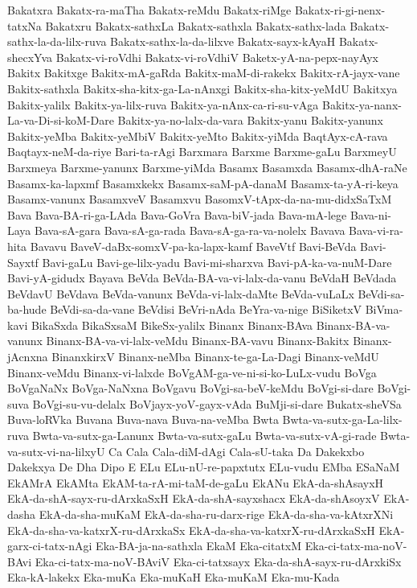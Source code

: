 {Bakatxra
Bakatx-ra-maTha
Bakatx-reMdu
Bakatx-riMge
Bakatx-ri-gi-nenx-tatxNa
Bakatxru
Bakatx-sathxLa
Bakatx-sathxla
Bakatx-sathx-lada
Bakatx-sathx-la-da-lilx-ruva
Bakatx-sathx-la-da-lilxve
Bakatx-sayx-kAyaH
Bakatx-shecxYva
Bakatx-vi-roVdhi
Bakatx-vi-roVdhiV
Baketx-yA-na-pepx-nayAyx
Bakitx
Bakitxge
Bakitx-mA-gaRda
Bakitx-maM-di-rakekx
Bakitx-rA-jayx-vane
Bakitx-sathxla
Bakitx-sha-kitx-ga-La-nAnxgi
Bakitx-sha-kitx-yeMdU
Bakitxya
Bakitx-yalilx
Bakitx-ya-lilx-ruva
Bakitx-ya-nAnx-ca-ri-su-vAga
Bakitx-ya-nanx-La-va-Di-si-koM-Dare
Bakitx-ya-no-lalx-da-vara
Bakitx-yanu
Bakitx-yanunx
Bakitx-yeMba
Bakitx-yeMbiV
Bakitx-yeMto
Bakitx-yiMda
BaqtAyx-cA-rava
Baqtayx-neM-da-riye
Bari-ta-rAgi
Barxmara
Barxme
Barxme-gaLu
BarxmeyU
Barxmeya
Barxme-yanunx
Barxme-yiMda
Basamx
Basamxda
Basamx-dhA-raNe
Basamx-ka-lapxmf
Basamxkekx
Basamx-saM-pA-danaM
Basamx-ta-yA-ri-keya
Basamx-vanunx
BasamxveV
Basamxvu
BasomxV-tApx-da-na-mu-didxSaTxM
Bava
Bava-BA-ri-ga-LAda
Bava-GoVra
Bava-biV-jada
Bava-mA-lege
Bava-ni-Laya
Bava-sA-gara
Bava-sA-ga-rada
Bava-sA-ga-ra-va-nolelx
Bavava
Bava-vi-ra-hita
Bavavu
BaveV-daBx-somxV-pa-ka-lapx-kamf
BaveVtf
Bavi-BeVda
Bavi-Sayxtf
Bavi-gaLu
Bavi-ge-lilx-yadu
Bavi-mi-sharxva
Bavi-pA-ka-va-nuM-Dare
Bavi-yA-gidudx
Bayava
BeVda
BeVda-BA-va-vi-lalx-da-vanu
BeVdaH
BeVdada
BeVdavU
BeVdava
BeVda-vanunx
BeVda-vi-lalx-daMte
BeVda-vuLaLx
BeVdi-sa-ba-hude
BeVdi-sa-da-vane
BeVdisi
BeVri-nAda
BeYra-va-nige
BiSiketxV
BiVma-kavi
BikaSxda
BikaSxsaM
BikeSx-yalilx
Binanx
Binanx-BAva
Binanx-BA-va-vanunx
Binanx-BA-va-vi-lalx-veMdu
Binanx-BA-vavu
Binanx-Bakitx
Binanx-jAcnxna
BinanxkirxV
Binanx-neMba
Binanx-te-ga-La-Dagi
Binanx-veMdU
Binanx-veMdu
Binanx-vi-lalxde
BoVgAM-ga-ve-ni-si-ko-LuLx-vudu
BoVga
BoVgaNaNx
BoVga-NaNxna
BoVgavu
BoVgi-sa-beV-keMdu
BoVgi-si-dare
BoVgi-suva
BoVgi-su-vu-delalx
BoVjayx-yoV-gayx-vAda
BuMji-si-dare
Bukatx-sheVSa
Buva-loRVka
Buvana
Buva-nava
Buva-na-veMba
Bwta
Bwta-va-sutx-ga-La-lilx-ruva
Bwta-va-sutx-ga-Lanunx
Bwta-va-sutx-gaLu
Bwta-va-sutx-vA-gi-rade
Bwta-va-sutx-vi-na-lilxyU
Ca
Cala
Cala-diM-dAgi
Cala-sU-taka
Da
Dakekxbo
Dakekxya
De
Dha
Dipo
E
ELu
ELu-nU-re-papxtutx
ELu-vudu
EMba
ESaNaM
EkAMrA
EkAMta
EkAM-ta-rA-mi-taM-de-gaLu
EkANu
EkA-da-shAsayxH
EkA-da-shA-sayx-ru-dArxkaSxH
EkA-da-shA-sayxshacx
EkA-da-shAsoyxV
EkA-dasha
EkA-da-sha-muKaM
EkA-da-sha-ru-darx-rige
EkA-da-sha-va-kAtxrXNi
EkA-da-sha-va-katxrX-ru-dArxkaSx
EkA-da-sha-va-katxrX-ru-dArxkaSxH
EkA-garx-ci-tatx-nAgi
Eka-BA-ja-na-sathxla
EkaM
Eka-citatxM
Eka-ci-tatx-ma-noV-BAvi
Eka-ci-tatx-ma-noV-BAviV
Eka-ci-tatxsayx
Eka-da-shA-sayx-ru-dArxkiSx
Eka-kA-lakekx
Eka-muKa
Eka-muKaH
Eka-muKaM
Eka-mu-Kada
}
